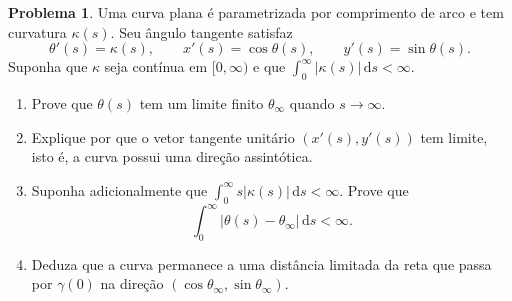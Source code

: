 \documentclass[10pt,a4paper]{amsart}
\renewcommand{\d}{\mathrm{d}}
\theoremstyle{definition}
\newtheorem{problema}{Problema}
\begin{document}
\begin{problema}
Uma curva plana é parametrizada por comprimento de arco e tem curvatura
$\kappa(s)$. Seu ângulo tangente satisfaz
\[
    \theta'(s)=\kappa(s),\qquad
    x'(s)=\cos\theta(s),\qquad
    y'(s)=\sin\theta(s).
\]
Suponha que $\kappa$ seja contínua em $[0,\infty)$ e que
$\int_0^\infty |\kappa(s)|\,\d s<\infty$.
\begin{enumerate}[label=(\alph*)]
    \item Prove que $\theta(s)$ tem um limite finito $\theta_\infty$ quando
    $s\to\infty$.
    \item Explique por que o vetor tangente unitário $(x'(s),y'(s))$ tem
    limite, isto é, a curva possui uma direção assintótica.
    \item Suponha adicionalmente que
    $\int_0^\infty s|\kappa(s)|\,\d s<\infty$. Prove que
    \[
        \int_0^\infty |\theta(s)-\theta_\infty|\,\d s<\infty.
    \]
    \item Deduza que a curva permanece a uma distância limitada da reta que
    passa por $\gamma(0)$ na direção $(\cos\theta_\infty,\sin\theta_\infty)$.
\end{enumerate}
\end{problema}
\end{document}
